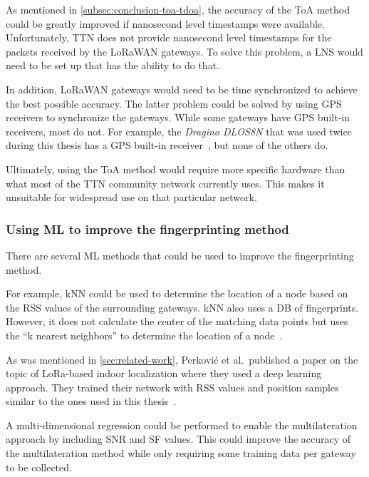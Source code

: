 As mentioned in \cref{subsec:conclusion-toa-tdoa}, the accuracy of the \ac{ToA} method could be greatly improved if nanosecond level timestamps were available.
Unfortunately, \ac{TTN} does not provide nanosecond level timestamps for the packets received by the \ac{LoRaWAN} gateways.
To solve this problem, a \ac{LNS} would need to be set up that has the ability to do that.

In addition, \ac{LoRaWAN} gateways would need to be time synchronized to achieve the best possible accuracy.
The latter problem could be solved by using \ac{GPS} receivers to synchronize the gateways.
While some gateways have \ac{GPS} built-in receivers, most do not.
For example, the \emph{Dragino DLOS8N} that was used twice during this thesis has a \ac{GPS} built-in receiver~\cite{dragino_technology_co_ltd_dlos8n_2023}, but none of the others do.

Ultimately, using the \ac{ToA} method would require more specific hardware than what most of the \ac{TTN} community network currently uses.
This makes it unsuitable for widespread use on that particular network.

\subsubsection{Using \acf{ML} to improve the fingerprinting method}

There are several \ac{ML} methods that could be used to improve the fingerprinting method.

For example, \ac{kNN} could be used to determine the location of a node based on the \ac{RSS} values of the surrounding gateways.
\ac{kNN} also uses a \ac{DB} of fingerprints.
However, it does not calculate the center of the matching data points but uses the ``k nearest neighbors'' to determine the location of a node~\cite{anagnostopoulos_reproducible_2019}.

As was mentioned in \cref{sec:related-work}, Perković et al.\ published a paper on the topic of \ac{LoRa}-based indoor localization where they used a deep learning approach.
They trained their network with \ac{RSS} values and position samples similar to the ones used in this thesis~\cite{perkovic_machine_2023}.

A multi-dimensional regression could be performed to enable the multilateration approach by including \ac{SNR} and \ac{SF} values.
This could improve the accuracy of the multilateration method while only requiring some training data per gateway to be collected.

